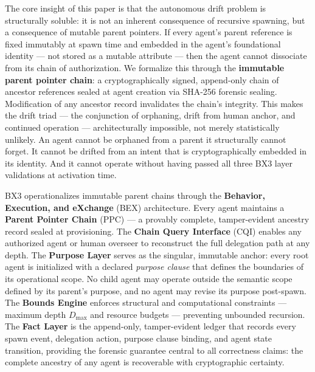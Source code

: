 The core insight of this paper is that the autonomous drift problem is structurally soluble: it is not an inherent consequence of recursive spawning, but a consequence of mutable parent pointers. If every agent's parent reference is fixed immutably at spawn time and embedded in the agent's foundational identity — not stored as a mutable attribute — then the agent cannot dissociate from its chain of authorization. We formalize this through the \textbf{immutable parent pointer chain}: a cryptographically signed, append-only chain of ancestor references sealed at agent creation via SHA-256 forensic sealing. Modification of any ancestor record invalidates the chain's integrity. This makes the drift triad — the conjunction of orphaning, drift from human anchor, and continued operation — architecturally impossible, not merely statistically unlikely. An agent cannot be orphaned from a parent it structurally cannot forget. It cannot be drifted from an intent that is cryptographically embedded in its identity. And it cannot operate without having passed all three BX3 layer validations at activation time.

BX3 operationalizes immutable parent chains through the \textbf{Behavior, Execution, and eXchange} (BEX) architecture. Every agent maintains a \textbf{Parent Pointer Chain} (PPC) — a provably complete, tamper-evident ancestry record sealed at provisioning. The \textbf{Chain Query Interface} (CQI) enables any authorized agent or human overseer to reconstruct the full delegation path at any depth. The \textbf{Purpose Layer} serves as the singular, immutable anchor: every root agent is initialized with a declared \textit{purpose clause} that defines the boundaries of its operational scope. No child agent may operate outside the semantic scope defined by its parent's purpose, and no agent may revise its purpose post-spawn. The \textbf{Bounds Engine} enforces structural and computational constraints — maximum depth $D_{\max}$ and resource budgets — preventing unbounded recursion. The \textbf{Fact Layer} is the append-only, tamper-evident ledger that records every spawn event, delegation action, purpose clause binding, and agent state transition, providing the forensic guarantee central to all correctness claims: the complete ancestry of any agent is recoverable with cryptographic certainty.

